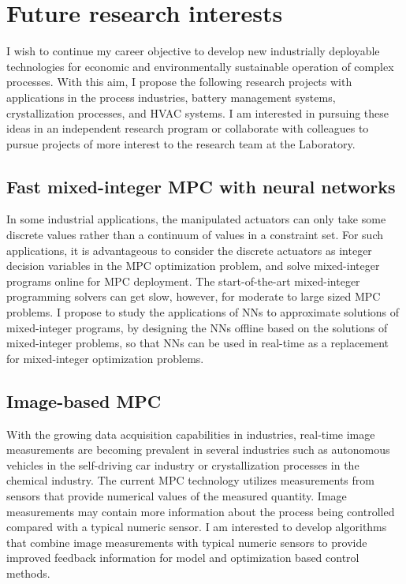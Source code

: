 \documentclass[11pt, a4paper]{article} %
\begin{document}
\section*{Future research interests}

I wish to continue my career objective to develop new industrially deployable technologies for economic and environmentally sustainable operation of complex processes. With this aim, I propose the following research projects with applications in the process industries, battery management systems, crystallization processes, and HVAC systems. I am interested in pursuing these ideas in an independent research program or collaborate with colleagues to pursue projects of more interest to the research team at the Laboratory.

\subsection*{Fast mixed-integer MPC with neural networks}

In some industrial applications, the manipulated actuators can only take some discrete values rather than a continuum of values in a constraint set. For such applications, it is advantageous to consider the discrete actuators as integer decision variables in the MPC optimization problem, and solve mixed-integer programs online for MPC deployment. The start-of-the-art mixed-integer programming solvers can get slow, however, for moderate to large sized MPC problems. I propose to study the applications of NNs to approximate solutions of mixed-integer programs, by designing the NNs offline based on the solutions of mixed-integer problems, so that NNs can be used in real-time as a replacement for  mixed-integer optimization problems.

\subsection*{Image-based MPC}

With the growing data acquisition capabilities in industries, real-time image measurements are becoming prevalent in several industries such as autonomous vehicles in the self-driving car industry or crystallization processes in the chemical industry. The current MPC technology utilizes measurements from sensors that provide numerical values of the measured quantity. Image measurements may contain more information about the process being controlled compared with a typical numeric sensor. I am interested to develop algorithms that combine image measurements with typical numeric sensors to provide improved feedback information for model and optimization based control methods.
\end{document}
